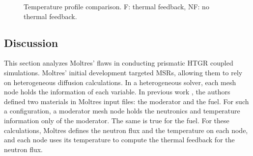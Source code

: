 \begin{figure}[htbp!]
  \centering
  \hfill
  \caption{Temperature profile comparison. F: thermal feedback, NF: no thermal feedback.}
  \label{fig:coupled-results-th}
\end{figure}

\subsection{Discussion}
\label{sec:discuss}

This section analyzes Moltres' flaws in conducting prismatic HTGR coupled simulations.
Moltres' initial development targeted MSRs, allowing them to rely on heterogeneous diffusion calculations.
In a heterogeneous solver, each mesh node holds the information of each variable.
In previous work \cite{lindsay_introduction_2018}\cite{pater_multiphysics_2019}, the authors defined two materials in Moltres input files: the moderator and the fuel.
For such a configuration, a moderator mesh node holds the neutronics and temperature information only of the moderator.
The same is true for the fuel.
For these calculations, Moltres defines the neutron flux and the temperature on each node, and each node uses its temperature to compute the thermal feedback for the neutron flux.

